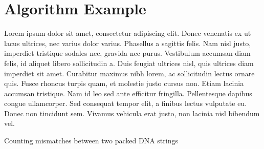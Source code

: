 \chapter{Algorithm Example}

Lorem ipsum dolor sit amet, consectetur adipiscing elit. Donec venenatis ex ut lacus ultrices, nec varius dolor varius. Phasellus a sagittis felis. Nam nisl justo, imperdiet tristique sodales nec, gravida nec purus. Vestibulum accumsan diam felis, id aliquet libero sollicitudin a. Duis feugiat ultrices nisl, quis ultrices diam imperdiet sit amet. Curabitur maximus nibh lorem, ac sollicitudin lectus ornare quis. Fusce rhoncus turpis quam, et molestie justo cursus non. Etiam lacinia accumsan tristique. Nam id leo sed ante efficitur fringilla. Pellentesque dapibus congue ullamcorper. Sed consequat tempor elit, a finibus lectus vulputate eu. Donec non tincidunt sem. Vivamus vehicula erat justo, non lacinia nisl bibendum vel.


\begin{algorithm}
  \caption{Counting mismatches between two packed DNA strings
    \label{alg:packed-dna-hamming}}
  \begin{algorithmic}[1]
    \Statex
       
        \EndIf
      \EndFor
      \State \Return{$\delta$}
    \EndFunction
  \end{algorithmic}
\end{algorithm}

